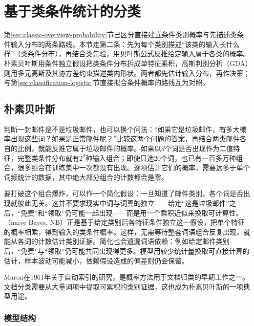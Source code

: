 \section{基于类条件统计的分类}
\label{sec:classification-statistical}

第\ref{sec:classic-overview-probability}节已区分直接建立条件类别概率与先描述类条件输入分布的两条路线。本节走第二条：先为每个类别描述“该类的输入长什么样”（类条件分布），再结合类先验，用贝叶斯公式反推给定输入属于各类的概率。朴素贝叶斯用条件独立假设把类条件分布拆成单特征乘积，高斯判别分析（GDA）则用多元高斯及其协方差约束描述类内形状。两者都先估计输入分布，再作决策；与第\ref{sec:classification-logistic}节直接拟合条件概率的路线互为对照。

\subsection{朴素贝叶斯}
\label{sec:classification-naive-bayes}

判断一封邮件是不是垃圾邮件，也可以换个问法：“如果它是垃圾邮件，有多大概率出现这些词？如果是正常邮件呢？”比较这两个问题的答案，再结合两类邮件各自的比例，就能反推它属于垃圾邮件的概率。如果以$d$个词是否出现作为二值特征，完整类条件分布就有$2^d$种输入组合；即使只选20个词，也已有一百多万种组合，很多组合在训练集中一次都没有出现。逐项估计它们的概率，需要远多于单个词频统计的数据，其中绝大部分组合的计数都会是零。

要打破这个组合爆炸，可以作一个简化假设：一旦知道了邮件类别，各个词是否出现就彼此无关。这并不要求现实中词与词真的独立——给定“这是垃圾邮件”之后，“免费”和“领取”仍可能一起出现——而是用一个乘积近似来换取可计算性。（naive Bayes, NB）正是基于给定类别后各特征条件独立这一假设，把单个特征的概率相乘，得到输入的类条件概率。这样，无需等待整套词语组合反复出现，就能从各词的计数估计类别证据。简化也会遗漏词语依赖：例如给定邮件类别后，“免费”与“领取”仍可能共同出现得更多。模型用较少统计量换取可直接计算的估计，样本波动可能减小，依赖假设造成的偏差则仍会保留。

Maron在1961年关于自动索引的研究，是概率方法用于文档归类的早期工作之一。文档分类需要从大量词项中提取可累积的类别证据，这也成为朴素贝叶斯的一项典型用途。

\subsubsection{模型结构}
\label{sec:classification-naive-bayes-structure}

